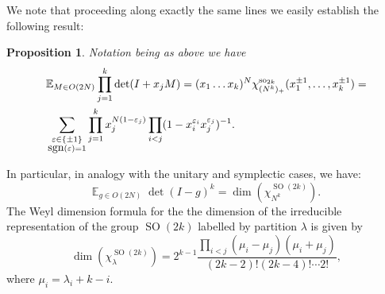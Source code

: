 \documentclass[11pt]{amsart}
\newcommand{\tmop}[1]{\ensuremath{\operatorname{#1}}}
\newtheorem{proposition}{Proposition}
\newcommand{\so}{{\rm so}}
\newcommand{\sgn}{{\hbox{\rm sgn}}}
\begin{document}
We note that proceeding along exactly the same lines we easily
establish the following result:

\begin{proposition}\label{prodo} Notation being as above we have
\begin{equation} \begin{aligned}
&{\mathbb E}_{M \in O(2N)} \prod_{j=1}^k \det (I+x_j M)=(x_1 \dots
x_k)^{N} \chi_{(N^k)_{+}}^{\so_{2k}}(x_1^{\pm 1},\dots, x_k^{\pm 1})=\\
& \sum_{\substack{\varepsilon\in\{\pm 1\}\\
\sgn(\varepsilon)=1 }}\prod_{j=1}^{k}x_j^{N (1-\varepsilon_j) }
\prod_{i < j}(1-x_i^{\varepsilon_i}x_j^{\varepsilon_j})^{-1}.
\end{aligned}
\end{equation}
\end{proposition}

In particular, in analogy with the unitary and symplectic cases,
we have:
\begin{equation}
  \label{e:orth17} \mathbb{E}_{g \in O ( 2 N )} \; \det ( I - g )^k = \dim (
  \chi_{N^k}^{\tmop{SO} ( 2 k )} ) .
\end{equation}
The Weyl dimension formula for the the dimension of the
irreducible representation of the group $\tmop{SO} ( 2 k )$
labelled by partition $\lambda$ is given by
\[ \dim ( \chi_{\lambda}^{\tmop{SO} ( 2 k )} ) = 2^{k - 1} \frac{\prod_{i < j}
   ( \mu_i - \mu_j ) ( \mu_i + \mu_j )}{( 2 k - 2 ) ! ( 2 k - 4 ) ! \cdots
   2!}, \]
where $\mu_i = \lambda_i + k - i$.
\end{document}
